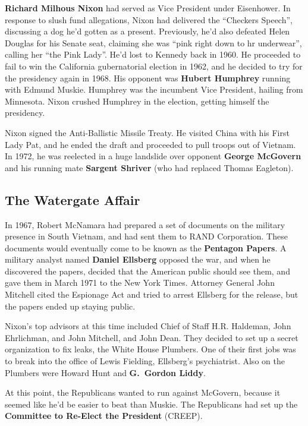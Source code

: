 \textbf{Richard Milhous Nixon} had served as Vice President under Eisenhower.
In response to slush fund allegations,
Nixon had delivered the ``Checkers Speech'', discussing a dog he'd gotten as a present.
Previously, he'd also defeated Helen Douglas for his Senate seat,
claiming she was ``pink right down to hr underwear'', calling her ``the Pink Lady''.
He'd lost to Kennedy back in 1960.
He proceeded to fail to win the California gubernatorial election in 1962,
and he decided to try for the presidency again in 1968.
His opponent was \textbf{Hubert Humphrey} running with Edmund Muskie.
Humphrey was the incumbent Vice President, hailing from Minnesota.
Nixon crushed Humphrey in the election, getting himself the presidency.

Nixon signed the Anti-Ballistic Missile Treaty.
He visited China with his First Lady Pat, and he ended the draft and proceeded to pull troops out of Vietnam.
In 1972, he was reelected in a huge landslide over opponent \textbf{George McGovern}
and his running mate \textbf{Sargent Shriver} (who had replaced Thomas Eagleton).

\subsection*{The Watergate Affair}

In 1967, Robert McNamara had prepared a set of documents on the military presence in South Vietnam,
and had sent them to RAND Corporation.
These documents would eventually come to be known as the \textbf{Pentagon Papers}.
A military analyst named \textbf{Daniel Ellsberg} opposed the war,
and when he discovered the papers, decided that the American public should see them,
and gave them in March 1971 to the New York Times.
Attorney General John Mitchell cited the Espionage Act and tried to arrest Ellsberg for the release,
but the papers ended up staying public.

Nixon's top advisors at this time included Chief of Staff H.R. Haldeman,
John Ehrlichman, and John Mitchell, and John Dean.
They decided to set up a secret organization to fix leaks, the White House Plumbers.
One of their first jobs was to break into the office of Lewis Fielding, Ellsberg's psychiatrist.
Also on the Plumbers were Howard Hunt and \textbf{G.\ Gordon Liddy}.

At this point, the Republicans wanted to run against McGovern,
because it seemed like he'd be easier to beat than Muskie.
The Republicans had set up the \textbf{Committee to Re-Elect the President} (CREEP).

